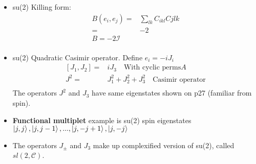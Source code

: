 \begin{itemize}
\begin{itemize}
    \end{itemize}
    \item su(2) Killing form: \cite{pfeifer}
    \begin{equation}\begin{split}
        B(e_i,e_j)=& \sum_{lk}C_{ikl}C{jlk} \\
        =&-2 \\
        B=-2\mathcal{I} \\
    \end{split}\end{equation}
    \item su(2) Quadratic Casimir operator. Define $e_i=-iJ_i$ \cite{pfeifer}
    \begin{equation}\begin{split}
    [J_1,J_2]=&iJ_3 \quad\text{With cyclic perms}A \\
    J^2=&J_1^2+J_2^2+J_3^2 \quad\text{Casimir operator} \\
    \end{split}\end{equation}
    The operators $J^2$ and $J_3$ have same eigenstates shown on p27 (familiar from spin).
    \item \textbf{Functional multiplet} example is su(2) spin eigenstates $\ket{j,j},\ket{j,j-1},...,\ket{j,-j+1},\ket{j,-j}$ \cite{pfeifer}
    \item The operators $J_\pm$ and $J_3$ make up complexified version of su(2), called $sl(2,\mathcal{C})$. \cite{pfeifer}
\end{itemize}

